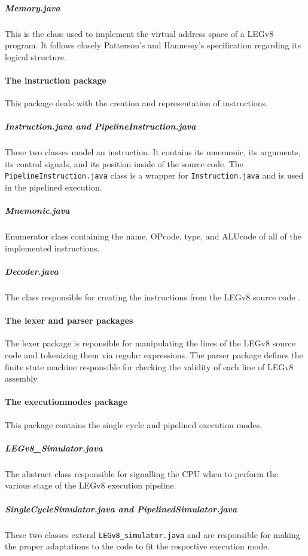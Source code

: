 \subparagraph*{Memory.java} 

This is the class used to implement the virtual address space of a LEGv8 program. It follows closely Patterson's and Hannessy's specification regarding its logical structure.

\paragraph*{The instruction package}

This package deals with the creation and representation of instructions.

\subparagraph*{Instruction.java and PipelineInstruction.java}

These two classes model an instruction. It contains its mnemonic, its arguments, its control signals, and its position inside of the source code. The \verb|PipelineInstruction.java| class is a wrapper for \verb|Instruction.java| and is used in the pipelined execution.

\subparagraph*{Mnemonic.java}

Enumerator class containing the name, OPcode, type, and ALUcode of all of the implemented instructions.

\subparagraph*{Decoder.java}

The class responsible for creating the instructions from the LEGv8 source code .

\paragraph*{The lexer and parser packages}

The lexer package is reponsible for manipulating the lines of the LEGv8 source code and tokenizing them via regular expressions. The parser package defines the finite state machine responsible for checking the validity of each line of LEGv8 assembly.

\paragraph*{The executionmodes package}

This package contains the single cycle and pipelined execution modes.

\subparagraph*{LEGv8\_Simulator.java}

The abstract class responsible for signalling the CPU when to perform the various stage of the LEGv8 execution pipeline.

\subparagraph*{SingleCycleSimulator.java and PipelinedSimulator.java}

These two classes extend \verb|LEGv8_simulator.java| and are responsible for making the proper adaptations to the code to fit the respective execution mode.